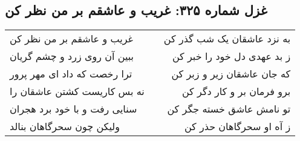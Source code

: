 \begin{center}
\section*{غزل شماره ۳۲۵: غریب و عاشقم بر من نظر کن}
\label{sec:325}
\begin{longtable}{l p{0.5cm} r}
غریب و عاشقم بر من نظر کن
&&
به نزد عاشقان یک شب گذر کن
\\
ببین آن روی زرد و چشم گریان
&&
ز بد عهدی دل خود را خبر کن
\\
ترا رخصت که داد ای مهر پرور
&&
که جان عاشقان زیر و زبر کن
\\
نه بس کاریست کشتن عاشقان را
&&
برو فرمان بر و کار دگر کن
\\
سنایی رفت و با خود برد هجران
&&
تو نامش عاشق خسته جگر کن
\\
ولیکن چون سحرگاهان بنالد
&&
ز آه او سحرگاهان حذر کن
\\
\end{longtable}
\end{center}
